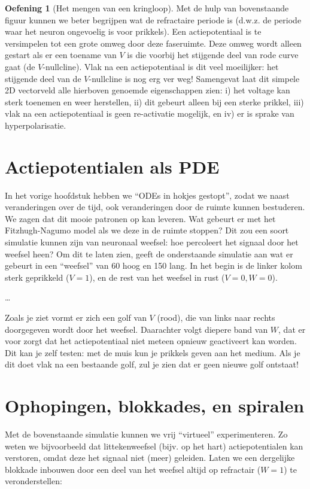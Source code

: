 \documentclass[
  a4paper,
]{scrbook}
\theoremstyle{definition}
\newtheorem{exercise}{Oefening}[chapter]
\theoremstyle{remark}
\begin{document}
\begin{exercise}[Het mengen van een
kringloop]
Met de hulp van bovenstaande figuur kunnen we beter begrijpen wat de
refractaire periode is (d.w.z. de periode waar het neuron ongevoelig is
voor prikkels). Een actiepotentiaal is te versimpelen tot een grote
omweg door deze faseruimte. Deze omweg wordt alleen gestart als er een
toename van \(V\) is die voorbij het stijgende deel van rode curve gaat
(de \(V\)-nullcline). Vlak na een actiepotentiaal is dit veel
moeilijker: het stijgende deel van de \(V\)-nullcline is nog erg ver
weg! Samengevat laat dit simpele 2D vectorveld alle hierboven genoemde
eigenschappen zien: i) het voltage kan sterk toenemen en weer
herstellen, ii) dit gebeurt alleen bij een sterke prikkel, iii) vlak na
een actiepotentiaal is geen re-activatie mogelijk, en iv) er is sprake
van hyperpolarisatie.

\section{Actiepotentialen als PDE}\label{actiepotentialen-als-pde}

In het vorige hoofdstuk hebben we ``ODEs in hokjes gestopt'', zodat we
naast veranderingen over de tijd, ook veranderingen door de ruimte
kunnen bestuderen. We zagen dat dit mooie patronen op kan leveren. Wat
gebeurt er met het Fitzhugh-Nagumo model als we deze in de ruimte
stoppen? Dit zou een soort simulatie kunnen zijn van neuronaal weefsel:
hoe percoleert het signaal door het weefsel heen? Om dit te laten zien,
geeft de onderstaande simulatie aan wat er gebeurt in een ``weefsel''
van 60 hoog en 150 lang. In het begin is de linker kolom sterk
geprikkeld (\(V=1\)), en de rest van het weefsel in rust (\(V=0,W=0\)).

\ldots{}

Zoals je ziet vormt er zich een golf van \(V\) (rood), die van links
naar rechts doorgegeven wordt door het weefsel. Daarachter volgt diepere
band van \(W\), dat er voor zorgt dat het actiepotentiaal niet meteen
opnieuw geactiveert kan worden. Dit kan je zelf testen: met de muis kun
je prikkels geven aan het medium. Als je dit doet vlak na een bestaande
golf, zul je zien dat er geen nieuwe golf ontstaat!

\section{Ophopingen, blokkades, en
spiralen}\label{ophopingen-blokkades-en-spiralen}

Met de bovenstaande simulatie kunnen we vrij ``virtueel''
experimenteren. Zo weten we bijvoorbeeld dat littekenweefsel (bijv. op
het hart) actiepotentialen kan verstoren, omdat deze het signaal niet
(meer) geleiden. Laten we een dergelijke blokkade inbouwen door een deel
van het weefsel altijd op refractair (\(W=1\)) te veronderstellen:


\end{exercise}
\end{document}
